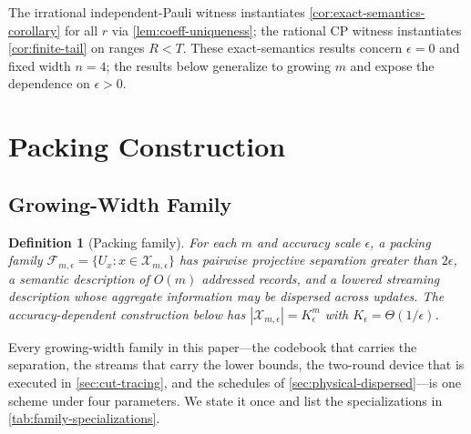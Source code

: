 \documentclass[a4paper,twocolumn,10pt,unpublished]{quantumarticle}
\newtheorem{definition}{Definition}
\begin{document}
The irrational independent-Pauli witness instantiates
\cref{cor:exact-semantics-corollary} for all $r$ via
\cref{lem:coeff-uniqueness}; the rational CP witness instantiates
\cref{cor:finite-tail} on ranges $R < T$. These exact-semantics results
concern $\epsilon = 0$ and fixed width $n = 4$; the results below
generalize to growing $m$ and expose the dependence on $\epsilon>0$.


\section{Packing Construction}
\label{sec:packing}

\subsection{Growing-Width Family}

\begin{definition}[Packing family]
\label{def:packing-family}
For each $m$ and accuracy scale $\epsilon$, a packing family
$\mathcal F_{m,\epsilon}=\{U_x:x\in\mathcal X_{m,\epsilon}\}$ has
pairwise projective separation greater than $2\epsilon$, a semantic
description of $O(m)$ addressed records, and a lowered streaming
description whose aggregate information may be dispersed across updates.
The accuracy-dependent construction below has
$|\mathcal X_{m,\epsilon}|=K_\epsilon^m$ with
$K_\epsilon=\Theta(1/\epsilon)$.
\end{definition}

Every growing-width family in this paper---the codebook that carries the
separation, the streams that carry the lower bounds, the two-round
device that is executed in \cref{sec:cut-tracing}, and the schedules of
\cref{sec:physical-dispersed}---is one scheme under four parameters.  We
state it once and list the specializations in
\cref{tab:family-specializations}.
\end{document}
